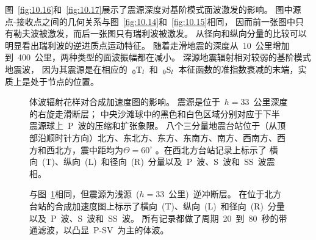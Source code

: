 图~\ref{fig:10.16}和~\ref{fig:10.17}展示了震源深度对基阶模式面波激发的影响。
图中源点-接收点之间的几何关系与图~\ref{fig:10.14}和~\ref{fig:10.15}相同，
因而前一张图中只有勒夫波被激发，而后一张图只有瑞利波被激发。
从径向和纵向分量的比较可以明显看出瑞利波的逆进质点运动特征。
随着走滑地震的深度从~10~公里增加到~400~公里，两种类型的面波振幅都在减小。
深源地震辐射相对较弱的基阶模式地震波，
因为其震源是在相应的~${}_0{\rm T}_l$~和~${}_0{\rm S}_l$~本征函数的准指数衰减的末端，实质上是处于节点的位置。

\begin{figure}[!t]
\begin{center}
\end{center}
\caption[seismogram7]{
\label{fig:10.18}
体波辐射花样对合成加速度图的影响。
震源是位于~$h=33$~公里深度的右旋走滑断层；
中央沙滩球中的黑色和白色区域分别对应于下半震源球上~P~波的压缩和扩张象限。
八个三分量地震台站位于（从顶部沿顺时针方向）北方、东北方、东方、东南方、南方、西南方、西方和西北方，震中距均为$\Theta=60^{\circ}$ 。在西北方台站记录上标示了
横向~(T)、纵向~(L)~和径向~(R)~分量以及~P~波、S~波和~SS~波震相。}
\end{figure}
\begin{figure}[!t]
\begin{center}
\end{center}
\caption[seismogram8]{
\label{fig:10.19}
与图~\protect\ref{fig:10.18}相同，但震源为浅源~($h=33$~公里)~逆冲断层。
在位于北方台站的合成加速度图上标示了横向~(T)、纵向~(L)~和径向~(R)~分量以及~P~波、S~波和~SS~波。
所有记录都做了周期~20~到~80~秒的带通滤波，以凸显~P-SV~为主的体波。}
\end{figure}

